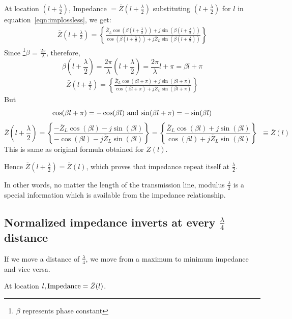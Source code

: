 At location ${\left(l+\frac{\lambda}{2}\right)}$, Impedance $= \bar{Z}\left(l+\frac{\lambda}{2}\right)$ substituting ${\left(l+\frac{\lambda}{2}\right)}$ for $l$ in equation~\ref{eqn:implossless}, we get: 
\begin{align*}
\bar{Z}\left(l+\frac{\lambda}{2}\right) = \left\lbrace \frac{\bar{Z}_L \cos(\beta \left(l+\frac{\lambda}{2}\right)) + j\sin(\beta \left(l+\frac{\lambda}{2}\right))}{\cos(\beta \left(l+\frac{\lambda}{2}\right)) + j\bar{Z}_L \sin(\beta \left(l+\frac{\lambda}{2}\right))}\right\rbrace 
\end{align*}
Since \footnote{$\beta$ represents phase constant}$\beta$ = $ \frac{2\pi}{\lambda}$, therefore,
\begin{dmath*}
\beta\left(l+\frac{\lambda}{2}\right)=\frac{2\pi}{\lambda}\left(l+\frac{\lambda}{2}\right)=\frac{2\pi}{\lambda}l+\pi=\beta l+\pi
\end{dmath*}
\begin{align*}
\bar{Z}\left(l+\frac{\lambda}{2}\right) = \left\lbrace \frac{\bar{Z}_L\cos(\beta l+\pi) + j\sin(\beta l+\pi)}{\cos(\beta l+\pi) + j\bar{Z}_L\sin(\beta l+\pi)}\right\rbrace 
\end{align*}
But 
\[
\cos(\beta l+\pi)=-\cos(\beta l)$ and $\sin(\beta l+\pi)=-\sin(\beta l)
\] 
\begin{dmath*}
\bar{Z}\left(l+\frac{\lambda}{2}\right)=\left\lbrace \frac{-\bar{Z}_L \cos(\beta l) - j\sin(\beta l)}{-\cos(\beta l) - j\bar{Z}_L \sin(\beta l)}\right\rbrace = \left\lbrace \frac{\bar{Z}_L \cos(\beta l) + j\sin(\beta l)}{\cos(\beta l) + j\bar{Z}_L \sin(\beta l)}\right\rbrace\;\;\equiv\bar{Z}(l)
\end{dmath*} 
This is same as original formula obtained for $\bar{Z}(l)$.

Hence $\bar{Z}\left(l+\frac{\lambda}{2}\right)=\bar{Z}(l)$, which proves that impedance repeat itself at $\frac{\lambda}{2}$.

In other words, no matter the length of the transmission line, modulus $\frac{\lambda}{2}$ is  a special information which is available from the impedance relationship.

\subsection{Normalized impedance inverts at every $\frac{\lambda}{4}$ distance}
If we move a distance of $\frac{\lambda}{4}$, we move from a maximum to minimum impedance and vice versa.

At location $l, \textnormal{Impedance}=\bar{Z}(l)$.

